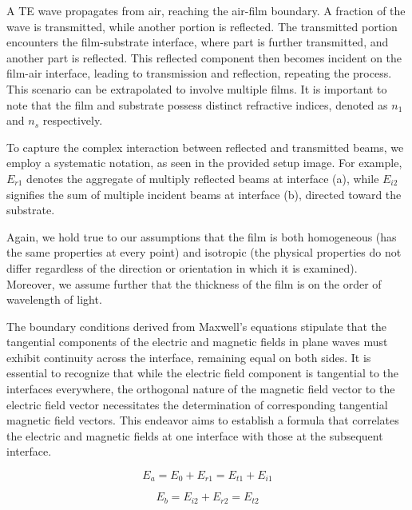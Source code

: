 A TE wave propagates from air, reaching the air-film boundary. A fraction of the wave is transmitted, while another portion is reflected. The transmitted portion encounters the film-substrate interface, where part is further transmitted, and another part is reflected. This reflected component then becomes incident on the film-air interface, leading to transmission and reflection, repeating the process. This scenario can be extrapolated to involve multiple films. It is important to note that the film and substrate possess distinct refractive indices, denoted as $n_1$ and $n_s$ respectively. %

To capture the complex interaction between reflected and transmitted beams, we employ a systematic notation, as seen in the provided setup image. For example, $E_{r1}$ denotes the aggregate of multiply reflected beams at interface (a), while $E_{i2}$ signifies the sum of multiple incident beams at interface (b), directed toward the substrate. %

Again, we hold true to our assumptions that the film is both homogeneous (has the same properties at every point) and isotropic (the physical properties do not differ regardless of the direction or orientation in which it is examined). Moreover, we assume further that the thickness of the film is on the order of wavelength of light.

The boundary conditions derived from Maxwell's equations stipulate that the tangential components of the electric and magnetic fields in plane waves must exhibit continuity across the interface, remaining equal on both sides. It is essential to recognize that while the electric field component is tangential to the interfaces everywhere, the orthogonal nature of the magnetic field vector to the electric field vector necessitates the determination of corresponding tangential magnetic field vectors. This endeavor aims to establish a formula that correlates the electric and magnetic fields at one interface with those at the subsequent interface. %

    \begin{equation} \label{E_a - Multilayer films electric field boundary equations}
    E_a = E_0 + E_{r1} = E_{t1} + E_{i1}
    \end{equation}
    
    \begin{equation} \label{E_b - Multilayer films electric field boundary equations}
    E_b = E_{i2} + E_{r2} = E_{t2}
    \end{equation}

